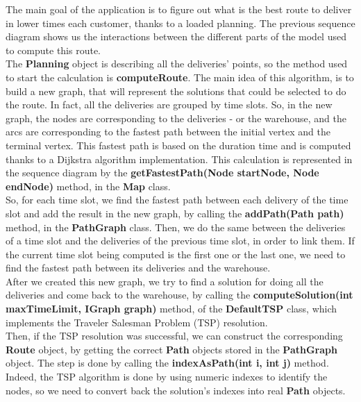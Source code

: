 \documentclass[paper=a4,fontsize=11pt]{report}
\numberwithin{equation}{section}		%
\numberwithin{figure}{section}		%
\numberwithin{table}{section}		%
\renewcommand{\bf}[1]{\textbf{#1}}
\begin{document}
The main goal of the application is to figure out what is the best route to deliver in lower times each customer, thanks to a loaded planning. The previous sequence diagram shows us the interactions between the different parts of the model used to compute this route.\\

The \bf{Planning} object is describing all the deliveries’ points, so the method used to start the calculation is \bf{computeRoute}. The main idea of this algorithm, is to build a new graph, that will represent the solutions that could be selected to do the route. In fact, all the deliveries are grouped by time slots. So, in the new graph, the nodes are corresponding to the deliveries - or the warehouse, and the arcs are corresponding to the fastest path between the initial vertex and the terminal vertex. This fastest path is based on the duration time and is computed thanks to a Dijkstra algorithm implementation. This calculation is represented in the sequence diagram by the \bf{getFastestPath(Node startNode, Node endNode)} method, in the \bf{Map} class.\\

So, for each time slot, we find the fastest path between each delivery of the time slot and add the result in the new graph, by calling the \bf{addPath(Path path)} method, in the \bf{PathGraph} class. Then, we do the same between the deliveries of a time slot and the deliveries of the previous time slot, in order to link them. If the current time slot being computed is the first one or the last one, we need to find the fastest path between its deliveries and the warehouse.\\

After we created this new graph, we try to find a solution for doing all the deliveries and come back to the warehouse, by calling the \bf{computeSolution(int maxTimeLimit, IGraph graph)} method, of the \bf{DefaultTSP} class, which implements the Traveler Salesman Problem (TSP) resolution.\\

Then, if the TSP resolution was successful, we can construct the corresponding \bf{Route} object, by getting the correct \bf{Path} objects stored in the \bf{PathGraph} object. The step is done by calling the \bf{indexAsPath(int i, int j)} method. Indeed, the TSP algorithm is done by using numeric indexes to identify the nodes, so we need to convert back the solution’s indexes into real \bf{Path} objects.\\
\end{document}
